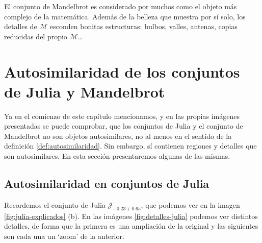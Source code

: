 El conjunto de Mandelbrot es considerado por muchos como el objeto más complejo de la matemática. Además de la belleza que muestra por sí solo, los detalles de $\mathcal{M}$ esconden bonitas estructuras: bulbos, valles, antenas, copias reducidas del propio $\mathcal{M}$\dots

\section{Autosimilaridad de los conjuntos de Julia y Mandelbrot}

Ya en el comienzo de este capítulo mencionamos, y en las propias imágenes presentadas se puede comprobar, que los conjuntos de Julia y el conjunto de Mandelbrot no son objetos autosimilares, no al menos en el sentido de la definición \ref{def:autosimilaridad}. Sin embargo, sí contienen regiones y detalles que son autosimilares. En esta sección presentaremos algunas de las mismas.

\subsection{Autosimilaridad en conjuntos de Julia}

Recordemos el conjunto de Julia $\mathcal{J}_{-0.23+0.65}$, que podemos ver en la imagen \ref{fig:julia-explicados} (b). En las imágenes \ref{fig:detalles-julia} podemos ver distintos detalles, de forma que la primera es una ampliación de la original y las siguientes son cada una un `zoom' de la anterior.

